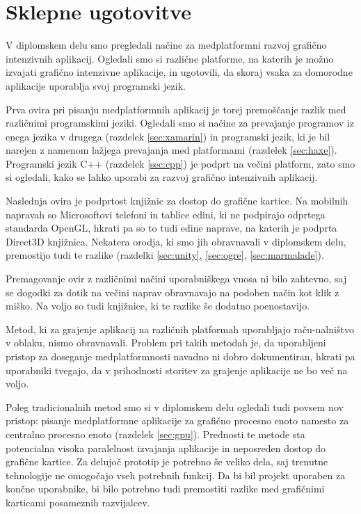 \chapter{Sklepne ugotovitve}

V diplomskem delu smo pregledali načine za medplatformni razvoj grafično intenzivnih aplikacij. Ogledali smo si različne platforme, na katerih je možno izvajati grafično intenzivne aplikacije, in ugotovili, da skoraj vsaka za domorodne aplikacije uporablja svoj programski jezik. 

Prva ovira pri pisanju medplatformnih aplikacij je torej premoščanje razlik med različnimi programskimi jeziki. Ogledali smo si načine za prevajanje programov iz enega jezika v drugega (razdelek \ref{sec:xamarin}) in programski jezik, ki je bil narejen z namenom lažjega prevajanja med platformami (razdelek \ref{sec:haxe}). Programski jezik C++ (razdelek \ref{sec:cpp}) je podprt na večini platform, zato smo si ogledali, kako se lahko uporabi za razvoj grafično intenzivnih aplikacij.

Naslednja ovira je podprtost knjižnic za dostop do grafične kartice. Na mobilnih napravah so Microsoftovi telefoni in tablice edini, ki ne podpirajo odprtega standarda OpenGL, hkrati pa so to tudi edine naprave, na katerih je podprta Direct3D knjižnica. Nekatera orodja, ki smo jih obravnavali v diplomskem delu, premostijo tudi te razlike (razdelki \ref{sec:unity}, \ref{sec:ogre}, \ref{sec:marmalade}).

Premagovanje ovir z različnimi načini uporabniškega vnosa ni bilo zahtevno, saj se dogodki za dotik na večini naprav obravnavajo na podoben način kot klik z miško. Na voljo so tudi knjižnice, ki te razlike še dodatno poenostavijo.

Metod, ki za grajenje aplikacij na različnih platformah uporabljajo raču-nalništvo v oblaku, nismo obravnavali. Problem pri takih metodah je, da uporabljeni pristop za doseganje medplatformnosti navadno ni dobro dokumentiran, hkrati pa uporabniki tvegajo, da v prihodnosti storitev za grajenje aplikacije ne bo več na voljo.  

Poleg tradicionalnih metod smo si v diplomskem delu ogledali tudi povsem nov pristop: pisanje medplatformne aplikacije za grafično procesno enoto namesto za centralno procesno enoto (razdelek \ref{sec:gpu}). Prednosti te metode sta potencialna visoka paralelnost izvajanja aplikacije in neposreden dostop do grafične kartice. Za delujoč prototip je potrebno še veliko dela, saj trenutne tehnologije ne omogočajo vseh potrebnih funkcij. Da bi bil projekt uporaben za končne uporabnike, bi bilo potrebno tudi premostiti razlike med grafičnimi karticami posameznih razvijalcev. 

